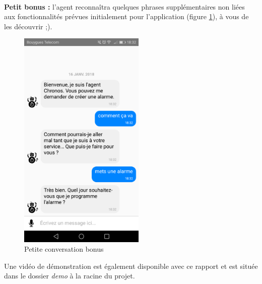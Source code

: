 ~\\\indent
\textbf{Petit bonus :} l'agent reconnaîtra quelques phrases supplémentaires non liées aux fonctionnalités prévues initialement pour l'application (figure \ref{J}), à vous de les découvrir \textsf{;)}.

\begin{figure}[H]
  \centering
  \includegraphics[width=6cm]{images/J.png}
  \caption{Petite conversation bonus}
  \label{J}
\end{figure}

Une vidéo de démonstration est également disponible avec ce rapport et est située dans le dossier \emph{demo} à la racine du projet.\\ 
